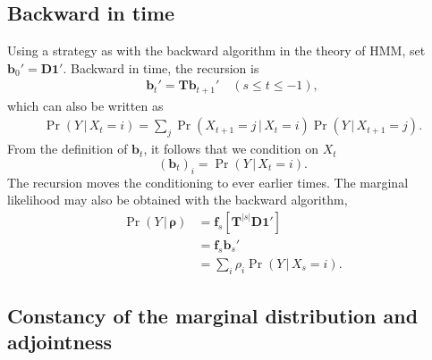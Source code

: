 \documentclass[preprint]{elsarticle}
\newcommand{\bs}[1]{\ensuremath{\boldsymbol{#1}}}
\newcommand\given{{\,|\,}}
\newcommand\x[1]{\ensuremath{X_{#1}}}
\newcommand\y{\ensuremath{Y}}
\newcommand\s{\ensuremath{s}}
\newcommand\fv[1]{\ensuremath{\mathbf{f}_{#1}}}
\newcommand\bv[1]{\ensuremath{\mathbf{b}_{#1}}}
\newcommand\oneC{\ensuremath{\mathbf{1}'}}
\begin{document}
\subsection{Backward in time}\label{section:backward}

Using a strategy as with the backward algorithm in the theory of HMM, set $\bv{0}'=\mathbf{D}\oneC$. Backward in time, the recursion is
\begin{equation}
\begin{split}
\bv{t}' = \mathbf{T} \bv{t+1}' \quad (\s \le t \le -1),
\end{split}
\end{equation}
which can also be written as
\begin{equation}\label{eq:backwards_discrete}
\begin{split}
\Pr(\y \given \x{t}=i) = \sum_j \Pr(\x{t+1}=j \given \x{t}=i) \Pr(\y \given \x{t+1}=j).
\end{split}
\end{equation}
From the definition of $\bv{t}$, it follows that we condition on $\x{t}$
\begin{equation}
(\bv{t})_{i} = \Pr(\y \given \x{t}=i).
\end{equation}
The recursion moves the conditioning to ever earlier times. The marginal likelihood may also be obtained with the backward algorithm,
\begin{equation}\label{eq:marg_lh}
\begin{split}
\Pr(\y \given \bs{\rho}) &= \fv{\s} \left[\mathbf{T}^{|\s|} \mathbf{D}\oneC\right]\\
                         &= \fv{\s} \bv{\s}' \\
                         &= \sum_i \rho_i \Pr(\y \given \x{\s}=i).
\end{split}
\end{equation}

\subsection{Constancy of the marginal distribution and adjointness}
\end{document}
